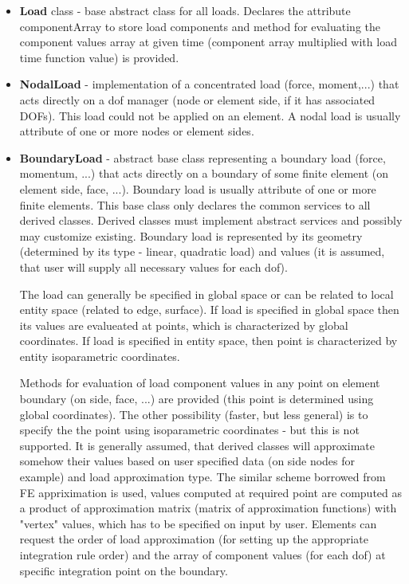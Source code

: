 \documentclass[12pt,draft]{article}
\newcommand{\class}[1]{{\bf #1}}
\newcommand{\attribute}[1]{#1}
\begin{document}
\begin{itemize}
\item
\class{Load} class - base abstract class for all loads. Declares the
attribute \attribute{componentArray} to store load components and
method for evaluating the component values array at given time (component array multiplied
with load time function value) is provided.
\item
\class{NodalLoad} - implementation of a concentrated load (force,
moment,...) that acts directly on a dof manager (node or element
side, if it has associated DOFs). 
This load could not be applied on an element. A nodal load is usually attribute of
one or more nodes or element sides.
\item
\class{BoundaryLoad} - abstract base class representing a boundary
load (force, momentum, ...) that acts directly on a boundary of some
finite element (on element side, face, ...). Boundary load is usually
attribute of one or more finite elements. This base class only
declares the common services to all derived classes. Derived
classes must implement abstract services and possibly may customize
existing. Boundary load is represented by its geometry (determined by
its type - linear, quadratic load) and values (it is assumed, that
user will supply all necessary values for each dof).

The load can generally be specified in global space or can be related
to local entity space (related to edge, surface). If load is specified
in global space then its values are evalueated at points, which is
characterized by global coordinates. If load is specified in entity
space, then point is characterized by entity isoparametric
coordinates.

Methods for evaluation of load component values in any point on
element boundary (on side, face, ...) are provided (this point is
determined using global coordinates). The other  possibility (faster, but less general) is to
specify the the point using isoparametric coordinates - but this is
not supported. It is generally assumed, that derived classes will
approximate somehow their values based on user  specified data (on
side nodes for example) and load approximation type. The similar
scheme borrowed from FE  appriximation is used, values computed at
required point are computed as a product of approximation matrix
(matrix of approximation functions) with "vertex" values, which has to
be specified on input by user. Elements can request the order of load
approximation (for setting up the appropriate integration rule order)
and the array of component values (for each dof) at specific
integration point on the boundary. 



\end{itemize}
\end{document}
